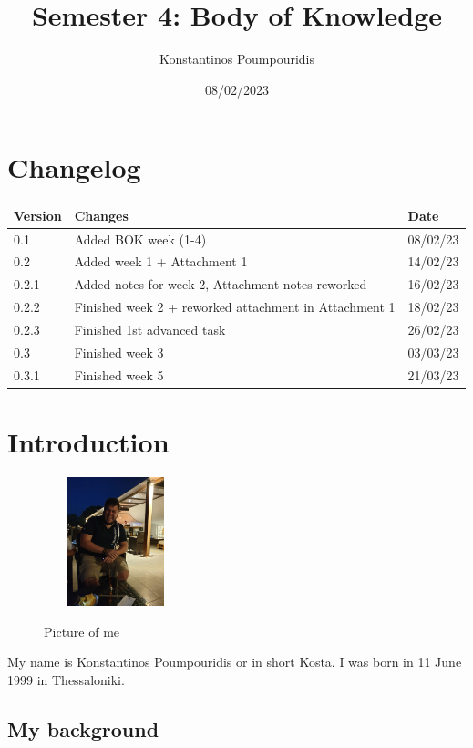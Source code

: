 \documentclass[12pt, letterpaper]{article}
\title{Semester 4: Body of Knowledge}
\author{Konstantinos Poumpouridis}
\date{08/02/2023}
\begin{document}
\maketitle
\thispagestyle{empty}
    
\newpage
\section{Changelog}
    \begin{table}[htbp]
        \begin{tabular}{|l|l|l|}
            \hline
            Version & Changes         & Date   \tabularnewline \hline
            0.1     & Added BOK week (1-4) & 08/02/23 \tabularnewline \hline
        0.2  &  Added week 1 + Attachment 1 & 14/02/23 \tabularnewline \hline
       0.2.1     &    Added notes for week 2, Attachment notes reworked     &  16/02/23      \tabularnewline \hline
       0.2.2  &  Finished week 2 + reworked attachment in Attachment 1 & 18/02/23 \tabularnewline \hline
       0.2.3  &  Finished 1st advanced task  & 26/02/23 \tabularnewline \hline
       0.3  &  Finished week 3  & 03/03/23 \tabularnewline \hline
        0.3.1  &  Finished week 5  & 21/03/23 \tabularnewline \hline
        \end{tabular}
    \end{table}
\newpage
\tableofcontents
\newpage
\section{Introduction}
\begin{figure}
    \includegraphics[width=0.25\textwidth]{fotos/Kosta.jpeg}
    \caption{Picture of me}
\end{figure}
My name is Konstantinos Poumpouridis or in short Kosta. I was born in 11 June 1999 in Thessaloniki.

\subsection{My background}
\end{document}
